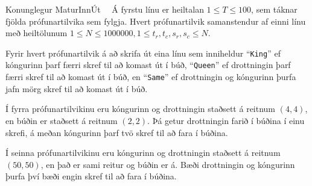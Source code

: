 \begin{problem}{Konunglegur Matur}{Inn}{Út}{~}{~}
	\Input
		Á fyrstu línu er heiltalan $1 \leq T \leq 100$, sem táknar fjölda prófunartilvika sem fylgja. Hvert prófunartilvik samanstendur af einni línu með heiltölunum $1 \leq N \leq 1000000, 1 \leq t_r, t_c, s_r, s_c \leq N$.

	\Output

		Fyrir hvert prófunartilvik á að skrifa út eina línu sem inniheldur "`\texttt{King}"' ef kóngurinn þarf færri skref til að komast út í búð, "`\texttt{Queen}"' ef drottningin þarf færri skref til að komast út í búð, en "`\texttt{Same}"' ef drottningin og kóngurinn þurfa jafn mörg skref til að komast út í búð.

	\Examples

		\begin{example}
		\end{example}

	\Explanation

		Í fyrra prófunartilvikinu eru kóngurinn og drottningin staðsett á reitnum $(4, 4)$, en búðin er staðsett á reitnum $(2,2)$. Þá getur drottningin farið í búðina í einu skrefi, á meðan kóngurinn þarf tvö skref til að fara í búðina.

		Í seinna prófunartilvikinu eru kóngurinn og drottningin staðsett á reitnum $(50, 50)$, en það er sami reitur og búðin er á. Bæði drottningin og kóngurinn þurfa því bæði engin skref til að fara í búðina.

\end{problem}
